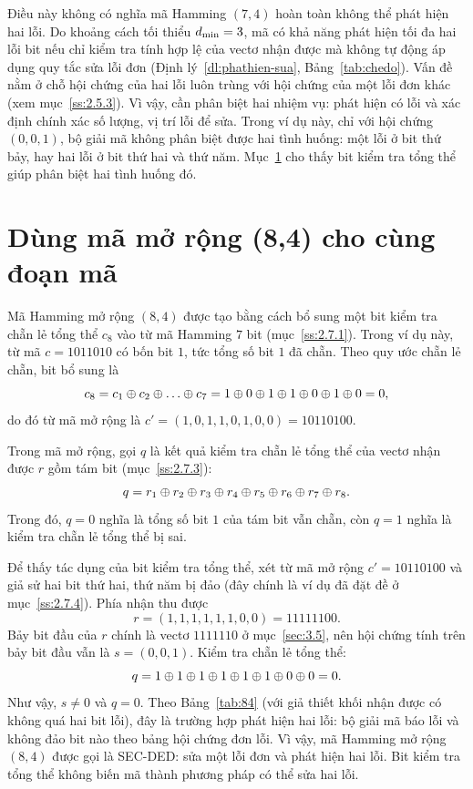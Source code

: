 Điều này không có nghĩa mã Hamming $(7,4)$ hoàn toàn không thể phát hiện hai
lỗi. Do khoảng cách tối thiểu $d_{\min} = 3$, mã có khả năng phát hiện tối đa hai
lỗi bit nếu chỉ kiểm tra tính hợp lệ của vectơ nhận được mà không tự động áp
dụng quy tắc sửa lỗi đơn (Định lý~\ref{dl:phathien-sua},
Bảng~\ref{tab:chedo}). Vấn đề nằm ở chỗ hội chứng của hai lỗi luôn
trùng với hội chứng của một lỗi đơn khác (xem mục~\ref{ss:2.5.3}). Vì vậy, cần
phân biệt hai nhiệm vụ: phát hiện có lỗi và xác định chính xác số lượng, vị trí
lỗi để sửa. Trong ví dụ này, chỉ với hội chứng $(0,0,1)$, bộ giải mã không phân
biệt được hai tình huống: một lỗi ở bit thứ bảy, hay hai lỗi ở bit thứ hai và
thứ năm. Mục~\ref{sec:3.6} cho thấy bit kiểm tra tổng thể giúp phân biệt hai
tình huống đó.

\section{Dùng mã mở rộng (8,4) cho cùng đoạn mã}
\label{sec:3.6}

Mã Hamming mở rộng $(8,4)$ được tạo bằng cách bổ sung một bit kiểm tra chẵn lẻ
tổng thể $c_8$ vào từ mã Hamming $7$ bit (mục~\ref{ss:2.7.1}). Trong ví dụ này,
từ mã $c = 1011010$ có bốn bit $1$, tức tổng số bit $1$ đã chẵn. Theo quy ước
chẵn lẻ chẵn, bit bổ sung là
\[
  c_8 = c_1 \xor c_2 \xor \dots \xor c_7
      = 1 \xor 0 \xor 1 \xor 1 \xor 0 \xor 1 \xor 0 = 0 ,
\]
do đó từ mã mở rộng là $c' = (1,0,1,1,0,1,0,0) = 10110100$.

Trong mã mở rộng, gọi $q$ là kết quả kiểm tra chẵn lẻ tổng thể của vectơ nhận
được $r$ gồm tám bit (mục~\ref{ss:2.7.3}):
\[
  q = r_1 \oplus r_2 \oplus r_3 \oplus r_4 \oplus r_5 \oplus r_6 \oplus r_7 \oplus r_8 .
\]
Trong đó, $q = 0$ nghĩa là tổng số bit $1$ của tám bit vẫn chẵn, còn $q = 1$
nghĩa là kiểm tra chẵn lẻ tổng thể bị sai.

Để thấy tác dụng của bit kiểm tra tổng thể, xét từ mã mở rộng $c' = 10110100$
và giả sử hai bit thứ hai, thứ năm bị đảo (đây chính là ví dụ đã đặt đề ở
mục~\ref{ss:2.7.4}). Phía nhận thu được
\[
  r = (1,1,1,1,1,1,0,0) = 11111100 .
\]
Bảy bit đầu của $r$ chính là vectơ $1111110$ ở mục~\ref{sec:3.5}, nên hội
chứng tính trên bảy bit đầu vẫn là $s = (0,0,1)$. Kiểm tra chẵn lẻ tổng thể:
\[
  q = 1 \oplus 1 \oplus 1 \oplus 1 \oplus 1 \oplus 1 \oplus 0 \oplus 0 = 0 .
\]
Như vậy, $s \neq 0$ và $q = 0$. Theo Bảng~\ref{tab:84} (với giả thiết khối nhận
được có không quá hai bit lỗi), đây là trường hợp phát hiện hai lỗi: bộ giải mã
báo lỗi và không đảo bit nào theo bảng hội chứng đơn lỗi. Vì vậy, mã Hamming mở
rộng $(8,4)$ được gọi là SEC-DED: sửa một lỗi đơn và phát hiện hai lỗi. Bit
kiểm tra tổng thể không biến mã thành phương pháp có thể sửa hai lỗi.

